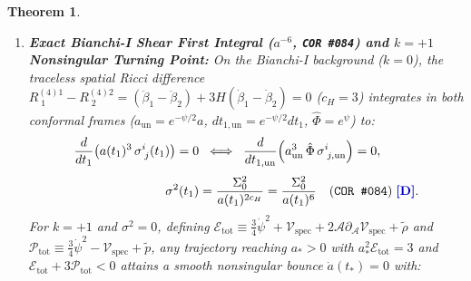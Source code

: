 \documentclass[11pt,a4paper]{article}
\newcommand{\catD}{\text{\textbf{\textcolor{blue!75!black}{[D]}}}}
\theoremstyle{definition}
\theoremstyle{plain}
\newtheorem{theorem}[axiom]{Theorem}
\theoremstyle{remark}
\begin{document}
\begin{theorem}
\begin{enumerate}[label=(\roman*)]
  \begin{equation}\label{eq:c5_yamabe_2d_zero}
  \xi_{\mathrm{Yamabe}}(d_{\mathrm{mini}}) \equiv \frac{d_{\mathrm{mini}} - 2}{4(d_{\mathrm{mini}} - 1)}\Bigg|_{d_{\mathrm{mini}} = d_t = 2} = 0 \;\;\catD,
  \end{equation}
  coordinate-reparametrization invariance on $\mathcal{M}_{\mathrm{mini}}$ and self-adjointness on $L^2(\mathcal{M}_{\mathrm{mini}}, \sqrt{|\det G_{AB}^{(\mathrm{mini})}|}\,d\tilde{a}\,d\psi)$ uniquely select the covariant Laplace--Beltrami wave operator, fixing the scale-factor ordering exponent to $p = 2 - 1 \equiv 1$ identically (\texttt{COR~\#085}):
  \begin{align}
  \widehat{\Delta}_{\mathrm{LB}}\Psi_{\mathrm{Univ}}(\tilde{a}, \psi) &\equiv \frac{1}{\sqrt{|\det G^{(\mathrm{mini})}|}}\,\partial_A\!\left(\sqrt{|\det G^{(\mathrm{mini})}|}\,G^{(\mathrm{mini})AB}\,\partial_B\Psi_{\mathrm{Univ}}\right) \nonumber \\[4pt]
  &= -\frac{1}{6\tilde{a}^2}\left[\frac{\partial}{\partial\tilde{a}}\!\left(\tilde{a}^p\,\frac{\partial\Psi_{\mathrm{Univ}}}{\partial\tilde{a}}\right) - \frac{4}{\tilde{a}}\,\frac{\partial^2\Psi_{\mathrm{Univ}}}{\partial\psi^2}\right]_{p=1} \;\;\catD. \label{eq:c5_wdw_laplace_beltrami}
  \end{align}
  \item \textbf{Exact Bianchi-I Shear First Integral ($a^{-6}$, \texttt{COR~\#084}) and $k = +1$ Nonsingular Turning Point:}
  On the Bianchi-I background ($k = 0$), the traceless spatial Ricci difference $R^{(4)1}_{\;1} - R^{(4)2}_{\;2} = (\ddot{\beta}_1 - \ddot{\beta}_2) + 3H(\dot{\beta}_1 - \dot{\beta}_2) = 0$ ($c_H = 3$) integrates in both conformal frames ($a_{\mathrm{un}} = e^{-\psi/2}a$, $dt_{1,\mathrm{un}} = e^{-\psi/2}dt_1$, $\hat{\Phi} = e^\psi$) to:
  \begin{align}
  \frac{d}{dt_1}\!\left(a(t_1)^3\,\sigma^i_{\;j}(t_1)\right) = 0 &\;\;\Longleftrightarrow\;\; \frac{d}{dt_{1,\mathrm{un}}}\!\left(a_{\mathrm{un}}^3\,\hat{\Phi}\,\sigma^i_{\;j,\mathrm{un}}\right) = 0, \nonumber \\[3pt]
  \sigma^2(t_1) &= \frac{\Sigma_0^2}{a(t_1)^{2c_H}} = \frac{\Sigma_0^2}{a(t_1)^6} \quad \textnormal{(\texttt{COR~\#084})} \;\catD. \label{eq:c5_bianchi_shear_integral}
  \end{align}
  For $k = +1$ and $\sigma^2 = 0$, defining $\mathcal{E}_{\mathrm{tot}} \equiv \frac{3}{4}\dot{\psi}^2 + \mathcal{V}_{\mathrm{spec}} + 2\mathcal{A}\partial_{\mathcal{A}}\mathcal{V}_{\mathrm{spec}} + \tilde{\rho}$ and $\mathcal{P}_{\mathrm{tot}} \equiv \frac{3}{4}\dot{\psi}^2 - \mathcal{V}_{\mathrm{spec}} + \tilde{p}$, any trajectory reaching $a_* > 0$ with $a_*^2\mathcal{E}_{\mathrm{tot}} = 3$ and $\mathcal{E}_{\mathrm{tot}} + 3\mathcal{P}_{\mathrm{tot}} < 0$ attains a smooth nonsingular bounce $\dot{a}(t_*) = 0$ with:

\end{enumerate}
\end{theorem}
\end{document}
